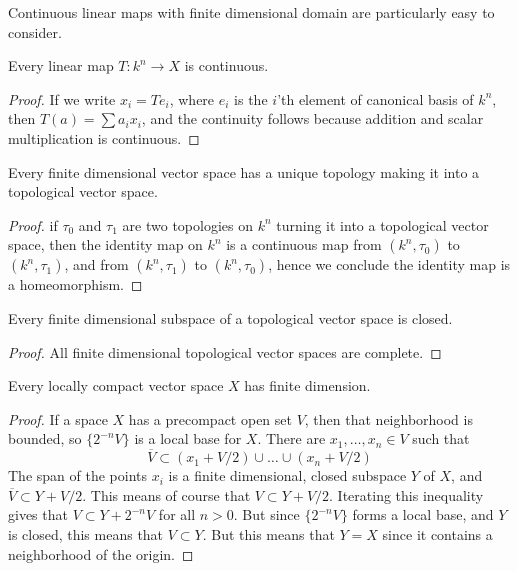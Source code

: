 Continuous linear maps with finite dimensional domain are particularly easy to consider.

\begin{lemma}
    Every linear map $T: k^n \to X$ is continuous.
\end{lemma}
\begin{proof}
    If we write $x_i = Te_i$, where $e_i$ is the $i$'th element of canonical basis of $k^n$, then $T(a) = \sum a_i x_i$, and the continuity follows because addition and scalar multiplication is continuous.
\end{proof}

\begin{corollary}
    Every finite dimensional vector space has a unique topology making it into a topological vector space.
\end{corollary}
\begin{proof}
    if $\tau_0$ and $\tau_1$ are two topologies on $k^n$ turning it into a topological vector space, then the identity map on $k^n$ is a continuous map from $(k^n, \tau_0)$ to $(k^n, \tau_1)$, and from $(k^n, \tau_1)$ to $(k^n, \tau_0)$, hence we conclude the identity map is a homeomorphism.
\end{proof}

\begin{corollary}
    Every finite dimensional subspace of a topological vector space is closed.
\end{corollary}
\begin{proof}
    All finite dimensional topological vector spaces are complete.
\end{proof}

\begin{theorem}
    Every locally compact vector space $X$ has finite dimension.
\end{theorem}
\begin{proof}
    If a space $X$ has a precompact open set $V$, then that neighborhood is bounded, so $\{ 2^{-n} V \}$ is a local base for $X$. There are $x_1, \dots, x_n \in V$ such that
    \[ \overline{V} \subset (x_1 + V/2) \cup \dots \cup (x_n + V/2) \]
    The span of the points $x_i$ is a finite dimensional, closed subspace $Y$ of $X$, and $\overline{V} \subset Y + V/2$. This means of course that $V \subset Y + V/2$. Iterating this inequality gives that $V \subset Y + 2^{-n} V$ for all $n > 0$. But since $\{ 2^{-n} V \}$ forms a local base, and $Y$ is closed, this means that $V \subset Y$. But this means that $Y = X$ since it contains a neighborhood of the origin.
\end{proof}

